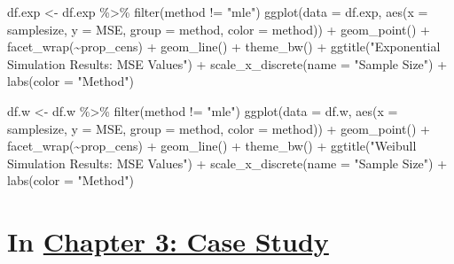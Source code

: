 \documentclass[12pt, twoside]{amherstthesis}
\newenvironment{Shaded}{\begin{snugshade}}{\end{snugshade}}
\newcommand{\AttributeTok}[1]{\textcolor[rgb]{0.77,0.63,0.00}{#1}}
\newcommand{\FunctionTok}[1]{\textcolor[rgb]{0.00,0.00,0.00}{#1}}
\newcommand{\NormalTok}[1]{#1}
\newcommand{\OtherTok}[1]{\textcolor[rgb]{0.56,0.35,0.01}{#1}}
\newcommand{\SpecialCharTok}[1]{\textcolor[rgb]{0.00,0.00,0.00}{#1}}
\newcommand{\StringTok}[1]{\textcolor[rgb]{0.31,0.60,0.02}{#1}}
\begin{document}
\begin{Shaded}
\begin{Highlighting}[]
\NormalTok{df.exp }\OtherTok{\textless{}{-}}\NormalTok{ df.exp }\SpecialCharTok{\%\textgreater{}\%}
  \FunctionTok{filter}\NormalTok{(method }\SpecialCharTok{!=} \StringTok{"mle"}\NormalTok{)}
\FunctionTok{ggplot}\NormalTok{(}\AttributeTok{data =}\NormalTok{ df.exp, }\FunctionTok{aes}\NormalTok{(}\AttributeTok{x =}\NormalTok{ samplesize, }\AttributeTok{y =}\NormalTok{ MSE, }\AttributeTok{group =}\NormalTok{ method, }\AttributeTok{color =}\NormalTok{ method)) }\SpecialCharTok{+} 
  \FunctionTok{geom\_point}\NormalTok{() }\SpecialCharTok{+}
  \FunctionTok{facet\_wrap}\NormalTok{(}\SpecialCharTok{\textasciitilde{}}\NormalTok{prop\_cens) }\SpecialCharTok{+}
  \FunctionTok{geom\_line}\NormalTok{() }\SpecialCharTok{+} 
  \FunctionTok{theme\_bw}\NormalTok{() }\SpecialCharTok{+}
  \FunctionTok{ggtitle}\NormalTok{(}\StringTok{"Exponential Simulation Results: MSE Values"}\NormalTok{) }\SpecialCharTok{+}
  \FunctionTok{scale\_x\_discrete}\NormalTok{(}\AttributeTok{name =} \StringTok{"Sample Size"}\NormalTok{) }\SpecialCharTok{+}
  \FunctionTok{labs}\NormalTok{(}\AttributeTok{color =} \StringTok{"Method"}\NormalTok{)}
\end{Highlighting}
\end{Shaded}
\begin{Shaded}
\begin{Highlighting}[]
\NormalTok{df.w }\OtherTok{\textless{}{-}}\NormalTok{ df.w }\SpecialCharTok{\%\textgreater{}\%}
  \FunctionTok{filter}\NormalTok{(method }\SpecialCharTok{!=} \StringTok{"mle"}\NormalTok{)}
\FunctionTok{ggplot}\NormalTok{(}\AttributeTok{data =}\NormalTok{ df.w, }\FunctionTok{aes}\NormalTok{(}\AttributeTok{x =}\NormalTok{ samplesize, }\AttributeTok{y =}\NormalTok{ MSE, }\AttributeTok{group =}\NormalTok{ method, }\AttributeTok{color =}\NormalTok{ method)) }\SpecialCharTok{+} 
  \FunctionTok{geom\_point}\NormalTok{() }\SpecialCharTok{+}
  \FunctionTok{facet\_wrap}\NormalTok{(}\SpecialCharTok{\textasciitilde{}}\NormalTok{prop\_cens) }\SpecialCharTok{+}
  \FunctionTok{geom\_line}\NormalTok{() }\SpecialCharTok{+} 
  \FunctionTok{theme\_bw}\NormalTok{() }\SpecialCharTok{+}
  \FunctionTok{ggtitle}\NormalTok{(}\StringTok{"Weibull Simulation Results: MSE Values"}\NormalTok{) }\SpecialCharTok{+}
  \FunctionTok{scale\_x\_discrete}\NormalTok{(}\AttributeTok{name =} \StringTok{"Sample Size"}\NormalTok{) }\SpecialCharTok{+}
  \FunctionTok{labs}\NormalTok{(}\AttributeTok{color =} \StringTok{"Method"}\NormalTok{)}
\end{Highlighting}
\end{Shaded}
\hypertarget{in-chapter-3-case-study}{%
\section{\texorpdfstring{In \protect\hyperlink{casestudy}{Chapter 3: Case Study}}{In Chapter 3: Case Study}}\label{in-chapter-3-case-study}}
\end{document}
